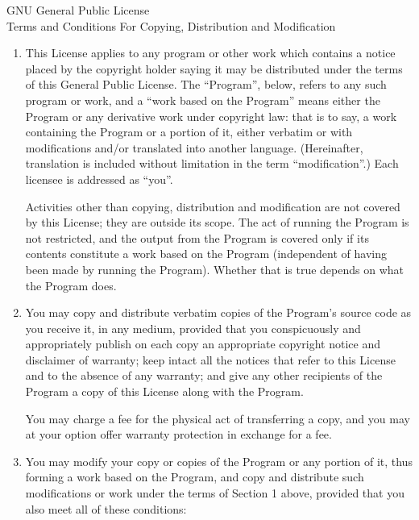 \documentclass[a4paper,11pt]{article}
\begin{document}
\begin{center}
{\Large \sc GNU General Public License
\\\vspace{3mm}Terms and Conditions For Copying, Distribution and Modification}
\end{center}


\begin{enumerate}

\addtocounter{enumi}{-1}

\item 

This License applies to any program or other work which contains a notice
placed by the copyright holder saying it may be distributed under the
terms of this General Public License.  The ``Program'', below, refers to
any such program or work, and a ``work based on the Program'' means either
the Program or any derivative work under copyright law: that is to say, a
work containing the Program or a portion of it, either verbatim or with
modifications and/or translated into another language.  (Hereinafter,
translation is included without limitation in the term ``modification''.)
Each licensee is addressed as ``you''.

Activities other than copying, distribution and modification are not
covered by this License; they are outside its scope.  The act of
running the Program is not restricted, and the output from the Program
is covered only if its contents constitute a work based on the
Program (independent of having been made by running the Program).
Whether that is true depends on what the Program does.

\item You may copy and distribute verbatim copies of the Program's source
  code as you receive it, in any medium, provided that you conspicuously
  and appropriately publish on each copy an appropriate copyright notice
  and disclaimer of warranty; keep intact all the notices that refer to
  this License and to the absence of any warranty; and give any other
  recipients of the Program a copy of this License along with the Program.

You may charge a fee for the physical act of transferring a copy, and you
may at your option offer warranty protection in exchange for a fee.

\item

You may modify your copy or copies of the Program or any portion
of it, thus forming a work based on the Program, and copy and
distribute such modifications or work under the terms of Section 1
above, provided that you also meet all of these conditions:


\end{enumerate}
\end{document}
